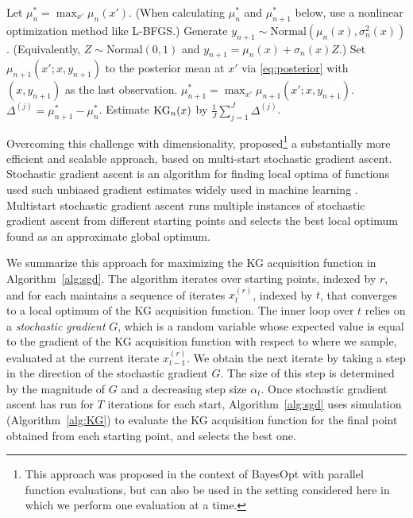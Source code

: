 \documentclass{article}
\begin{document}
\begin{algorithmic}
\begin{algorithm}
\STATE Let $\mu^{*}_n = \max_{x'} \mu_{n}(x')$.
\STATE (When calculating $\mu^*_n$ and $\mu^*_{n+1}$ below, use a nonlinear optimization method like L-BFGS.)
\STATE Generate $y_{n+1} \sim \mathrm{Normal}(\mu_n(x),\sigma^2_n(x))$.
(Equivalently, $Z\sim\mathrm{Normal}(0,1)$ and $y_{n+1} = \mu_n(x) + \sigma_n(x) Z$.)
\STATE Set $\mu_{n+1}(x';x,y_{n+1})$ to the posterior mean at $x'$ via \eqref{eq:posterior} with $(x,y_{n+1})$ as the last observation.
\STATE $\mu^*_{n+1} = \max_{x'} \mu_{n+1}(x';x,y_{n+1})$.
\STATE $\Delta^{(j)} = \mu^*_{n+1} - \mu^*_n$.
\ENDFOR
\STATE Estimate $\KG_n(x)$ by $\frac1J \sum_{j=1}^J \Delta^{(j)}$.
\caption{
Simulation-based computation of the knowledge-gradient factor $\KG_n(x)$.
\label{alg:KG}
}
\end{algorithm}
\end{algorithmic}

Overcoming this challenge with dimensionality,
\cite{wu2016parallel} proposed\footnote{This approach was proposed in the context of BayesOpt with parallel function evaluations, but can also be used in the setting considered here in which we perform one evaluation at a time.} a substantially more efficient and scalable approach, based on multi-start stochastic gradient ascent.
Stochastic gradient ascent \citep{Ro51,blum1954multidimensional} is an algorithm for finding local optima of functions used such unbiased gradient estimates widely used in machine learning \citep{bottou2012stochastic}. Multistart stochastic gradient ascent \citep{marti2016multi} runs multiple instances of stochastic gradient ascent from different starting points and selects the best local optimum found as an approximate global optimum.

We summarize this approach for maximizing the KG acquisition function in Algorithm~\ref{alg:sgd}.
The algorithm iterates over starting points, indexed by $r$, and for each maintains a sequence of iterates $x_t^{(r)}$, indexed by $t$, that converges to a local optimum of the KG acquisition function.
The inner loop over $t$ relies on a {\it stochastic gradient} $G$, which is a random variable whose expected value is equal to the gradient of the KG acquisition function with respect to where we sample, evaluated at the current iterate $x_{t-1}^{(r)}$.  We obtain the next iterate by taking a step in the direction of the stochastic gradient $G$.  The size of this step is determined by the magnitude of $G$ and a decreasing step size $\alpha_t$.  Once stochastic gradient ascent has run for $T$ iterations for each start, Algorithm~\ref{alg:sgd} uses simulation (Algorithm~\ref{alg:KG}) to evaluate the KG acquisition function for the final point obtained from each starting point, and selects the best one.
\end{document}
